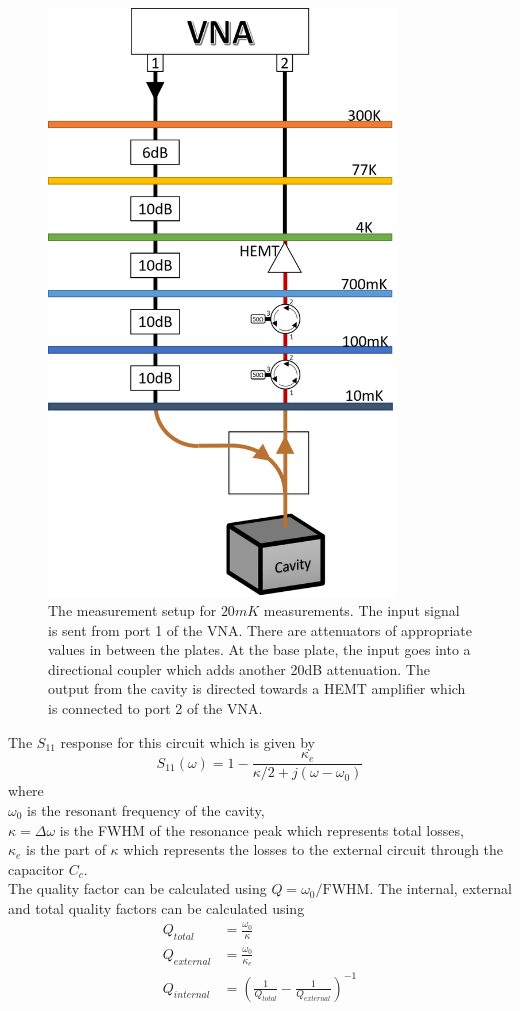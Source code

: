 \begin{figure}
\centering
\includegraphics[width=350px]{Figures/circuit.png}
\decoRule
\caption[External Circuit]{The measurement setup for $20mK$ measurements. The input signal is sent from port 1 of the VNA. There are attenuators of appropriate values in between the plates. At the base plate, the input goes into a directional coupler which adds another 20dB attenuation. The output from the cavity is directed towards a HEMT amplifier which is connected to port 2 of the VNA.}
\label{fig:circuit with fridge}
\end{figure}

The $S_{11}$ response for this circuit which is given by \cite{Aspelmeyer2014}
\begin{equation}
S_{11}(\omega) = 1-\frac{\kappa_e}{\kappa/2+j(\omega-\omega_0)}
\end{equation}
where\\
$\omega_0$ is the resonant frequency of the cavity,\\
$\kappa = \Delta\omega$ is the FWHM of the resonance peak which represents total losses,\\
$\kappa_e$ is the part of $\kappa$ which represents the losses to the external circuit through the capacitor $C_c$.\\
The quality factor can be calculated using $Q = \omega_0/\text{FWHM}$. The internal, external and total quality factors can be calculated using
\begin{align}
Q_{total} &= \frac{\omega_0}{\kappa}\\
Q_{external} &= \frac{\omega_0}{\kappa_e}\\
Q_{internal} &= \left(\frac{1}{Q_{total}}-\frac{1}{Q_{external}}\right)^{-1}\\
\end{align}

